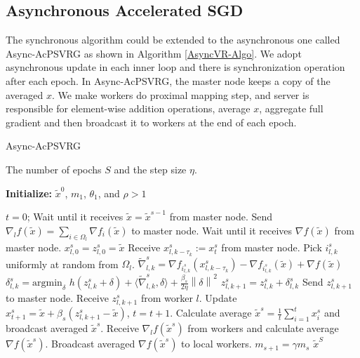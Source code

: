 \documentclass[conference]{IEEEtran}
\newcommand{\norm}[1]{\left\lVert#1\right\rVert}
\renewcommand{\algorithmicrequire}{
\textbf{Input:}}
\renewcommand{\algorithmicensure}{\textbf{Output:}}
\theoremstyle{definition}
\theoremstyle{remark}
\begin{document}
\subsection{Asynchronous Accelerated SGD}

The  synchronous algorithm could be extended to the asynchronous one called Async-AcPSVRG  as shown in Algorithm \ref{AsyncVR-Algo}. We adopt asynchronous update in each inner loop and there is synchronization operation after each epoch. In Async-AcPSVRG, the  master node keeps a copy of the averaged $x$. We make workers do proximal mapping step, and server is responsible for element-wise addition operations, average $x$, aggregate full gradient and then broadcast it to workers at the end of each epoch. 
\begin{algorithm}[H]
\caption{Async-AcPSVRG}\label{AsyncVR-Algo}
\begin{algorithmic}
\renewcommand{\algorithmicrequire}{\textbf{Input:}}
 \renewcommand{\algorithmicensure}{\textbf{Output:}}
  \newcommand{\INITIALIZE}{\item[\textbf{Initialize:}]}
\REQUIRE The number of epochs $S$ and the step size $\eta$.
\INITIALIZE  $\widetilde{x}^0$, $m_1$, $\theta_1$, and $\rho > 1$

\STATE $t=0$;
\STATE Wait until it receives $\widetilde{x} = \widetilde{x}^{s-1}$ from master node.
\STATE  Send $\nabla_l f(\widetilde{x}) = \sum_{i\in\Omega_l}\nabla f_i(\widetilde{x})$ to master node.
\STATE  Wait until it receives $\nabla f(\widetilde{x})$ from master node.
\STATE $x_{l,0}^s = z_{l,0}^s = \widetilde{x}$
 \STATE Receive $x_{l,k-\tau_k}^s:=x_{t}^s$ from master node.
 \STATE Pick $i_{l,k}^s$ uniformly at random from $\Omega_l$.
 \STATE $\widetilde{\nabla}_{l,k}^s = \nabla f_{i_{l,k}^s}(x_{l,k-\tau_k}^s) - \nabla f_{i_{l,k}^s}(\widetilde{x}) + \nabla f(\widetilde{x})$
 \STATE $\delta_{l,k}^s = \text{argmin}_{\delta}\,\,h(z_{l,k}^s+\delta)+\langle\widetilde{\nabla}_{l,k}^s,\delta\rangle + \frac{{\beta_s}}{2\eta}\norm{\delta}^2$
 \STATE $z_{l,k+1}^s = z_{l,k}^s + \delta_{l,k}^s$
 \STATE Send $z_{l,k+1}^s$ to master node.
 \STATE Receive $z_{l,k+1}^s$ from worker $l$. 
  \STATE Update $x^s_{t+1} = \widetilde{x}+\beta_s(z_{l,k+1}^s-\widetilde{x})$, $t=t+1$.
  \ENDFOR
   \STATE Calculate average $\widetilde{x}^s = \frac{1}{t}\sum_{i=1}^{t} x_{i}^s$ and broadcast averaged $\widetilde{x}^s$. 
  \STATE Receive $\nabla_l f(\widetilde{x}^s)$ from workers and calculate average $\nabla f(\widetilde{x}^s)$.
  \STATE Broadcast averaged $\nabla f(\widetilde{x}^s)$ to local workers.
  \STATE $m_{s+1} = \gamma m_s$
  \ENDFOR
 \ENSURE $\widetilde{x}^S$
\end{algorithmic}
\end{algorithm}
\end{document}

